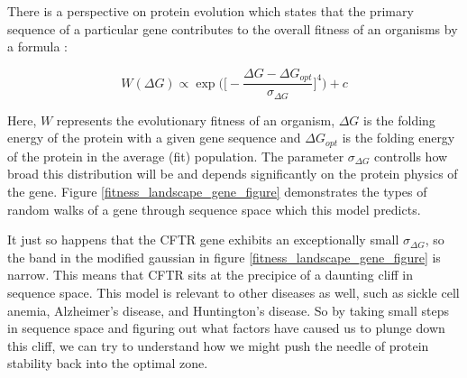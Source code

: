 There is a perspective on protein evolution which states that the primary sequence of a particular gene contributes to the overall fitness of an organisms by a formula \cite{depristo2005}:

\begin{equation}
	\label{fitness_equation}
	W(\Delta G) \propto \exp\bigg(\bigg[-\frac{\Delta G - \Delta G_{opt}}{\sigma_{\Delta G}}\bigg]^4\bigg) + c
\end{equation}

Here, $W$ represents the evolutionary fitness of an organism, $\Delta G$ is the folding energy of the protein with a given gene sequence and $\Delta G_{opt}$ is the folding energy of the protein in the average (fit) population. The parameter $\sigma_{\Delta G}$ controlls how broad this distribution will be and depends significantly on the protein physics of the gene. Figure \ref{fitness_landscape_gene_figure} demonstrates the types of random walks of a gene through sequence space which this model predicts. 

It just so happens that the CFTR gene exhibits an exceptionally small $\sigma_{\Delta G}$, so the band in the modified gaussian in figure \ref{fitness_landscape_gene_figure} is narrow. This means that CFTR sits at the precipice of a daunting cliff in sequence space. This model is relevant to other diseases as well, such as sickle cell anemia, Alzheimer's disease, and Huntington's disease. So by taking small steps in sequence space and figuring out what factors have caused us to plunge down this cliff, we can try to understand how we might push the needle of protein stability back into the optimal zone.

